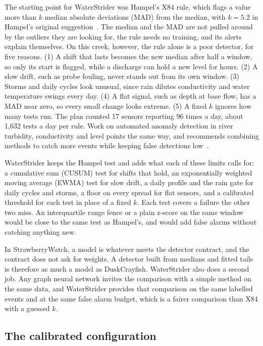 \documentclass{article}
\begin{document}
The starting point for WaterStrider was Hampel's X84 rule, which flags a value
more than $k$ median absolute deviations (MAD) from the median, with $k = 5.2$
in Hampel's original suggestion~\citep{hampel1985breakdown}. The median and
the MAD are not pulled around by the outliers they are looking for, the rule
needs no training, and its alerts explain themselves. On this creek, however,
the rule alone is a poor detector, for five reasons. (1) A shift that lasts
becomes the new median after half a window, so only its start is flagged,
while a discharge can hold a new level for hours. (2) A slow drift, such as
probe fouling, never stands out from its own window. (3) Storms and daily
cycles look unusual, since rain dilutes conductivity and water temperature
swings every day. (4) A flat signal, such as depth at base flow, has a MAD near
zero, so every small change looks extreme. (5) A fixed $k$ ignores how many
tests run. The plan counted 17 sensors reporting 96 times a day, about
1{,}632 tests a day per rule. Work on automated anomaly detection in river
turbidity, conductivity and level points the same way, and recommends
combining methods to catch more events while keeping false detections
low~\citep{leigh2019framework}.

WaterStrider keeps the Hampel test and adds what each of these limits calls
for: a cumulative sum (CUSUM) test for shifts that hold, an exponentially
weighted moving average (EWMA) test for slow drift, a daily profile and the
rain gate for daily cycles and storms, a floor on every spread for flat
sensors, and a calibrated threshold for each test in place of a fixed $k$. Each
test covers a failure the other two miss. An interquartile range fence or a
plain z-score on the same window would be close to the same test as Hampel's,
and would add false alarms without catching anything new.

In StrawberryWatch, a model is whatever meets the detector contract, and the
contract does not ask for weights. A detector built from medians and fitted
tails is therefore as much a model as DuskCrayfish. WaterStrider also does a
second job. Any graph neural network invites the comparison with a simple
method on the same data, and WaterStrider provides that comparison on the same
labelled events and at the same false alarm budget, which is a fairer
comparison than X84 with a guessed $k$.

\subsection{The calibrated configuration}
\label{sec:configuration}
\end{document}
